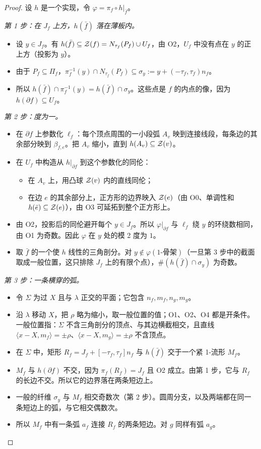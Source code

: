 \begin{proof}
设 $h$ 是一个实现，令 $\varphi=\pi_f\circ h|_{\bar f}$。

\emph{第 1 步：在 $J_f$ 上方，$h(\bar f)$ 落在薄板内。}
\begin{itemize}
\item 设 $y\in J_f$。有 $h(\bar f)\subseteq\mathcal{Z}(f)=N_{\tau_f}(P_f)\cup U_f$，由 O2，$U_f$ 中没有点在 $y$ 的正上方（投影为 $y$）。
\item 由于 $P_f\subseteq\Pi_f$，$\pi_f^{-1}(y)\cap N_{\tau_f}(P_f)\subseteq\sigma_y:=y+(-\tau_f,\tau_f)n_f$。
\item 所以 $h(\bar f)\cap\pi_f^{-1}(y)=h(\bar f)\cap\sigma_y$。这些点是 $f$ 的内点的像，因为 $h(\partial f)\subseteq U_f$。
\end{itemize}

\emph{第 2 步：度为一。}
\begin{itemize}
\item 在 $\partial f$ 上参数化 $\ell_f$：每个顶点周围的一小段弧 $A_v$ 映到连接线段，每条边的其余部分映到 $\beta_{f,e}$。把 $A_v$ 缩小，直到 $h(A_v)\subseteq\mathcal{Z}(v)$。
\item 在 $U_f$ 中构造从 $h|_{\partial f}$ 到这个参数化的同伦：
  \begin{itemize}
  \item 在 $A_v$ 上，用凸球 $\mathcal{Z}(v)$ 内的直线同伦；
  \item 在边 $e$ 的其余部分上，正方形的边界映入 $\mathcal{Z}(e)$（由 O0、单调性和 $h(\bar e)\subseteq\mathcal{Z}(e)$），由 O3 可延拓到整个正方形上。
  \end{itemize}
\item 由 O2，投影后的同伦避开每个 $y\in J_f$。所以 $\varphi|_{\partial f}$ 与 $\ell_f$ 绕 $y$ 的环绕数相同，由 O1 为奇数。因此 $\varphi$ 在 $y$ 处的模 2 度为 $1$。
\item 取 $\bar f$ 的一个使 $h$ 线性的三角剖分。对 $y\notin\varphi(\text{1-骨架})$（一旦第 3 步中的截面取成一般位置，这只排除 $J_f$ 上的有限个点），$\#(h(\bar f)\cap\sigma_y)$ 为奇数。
\end{itemize}

\emph{第 3 步：一条横穿的弧。}
\begin{itemize}
\item 令 $\Sigma$ 为过 $X$ 且与 $\lambda$ 正交的平面；它包含 $n_f,m_f,n_g,m_g$。
\item 沿 $\lambda$ 移动 $X$，把 $\rho$ 略为缩小，取一般位置的值；O1、O2、O4 都是开条件。一般位置指：$\Sigma$ 不含三角剖分的顶点、与其边横截相交，且直线 $\langle x-X,m_f\rangle=\pm\rho$、$\langle x-X,m_g\rangle=\pm\rho$ 不含顶点。
\item 在 $\Sigma$ 中，矩形 $R_f=J_f+[-\tau_f,\tau_f]n_f$ 与 $h(\bar f)$ 交于一个紧 1-流形 $M_f$。
\item $M_f$ 与 $h(\partial f)$ 不交，因为 $\pi_f(R_f)=J_f$ 且 O2 成立。由第 1 步，它与 $R_f$ 的长边不交。所以它的边界落在两条短边上。
\item 一般的纤维 $\sigma_y$ 与 $M_f$ 相交奇数次（第 2 步）。圆周分支，以及两端都在同一条短边上的弧，与它相交偶数次。
\item 所以 $M_f$ 中有一条弧 $a_f$ 连接 $R_f$ 的两条短边。对 $g$ 同样有弧 $a_g$。
\end{itemize}


\end{proof}
